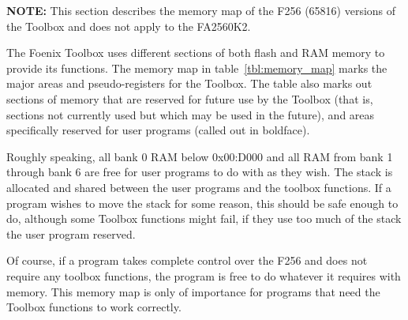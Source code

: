 \begin{tcolorbox}
	{\bf NOTE:} This section describes the memory map of the F256 (65816) versions of the Toolbox and does not apply to the FA2560K2.
\end{tcolorbox}

The Foenix Toolbox uses different sections of both flash and RAM memory to provide its functions.
The memory map in table~\ref{tbl:memory_map} marks the major areas and pseudo-registers for the Toolbox.
The table also marks out sections of memory that are reserved for future use by the Toolbox (that is,
sections not currently used but which may be used in the future), and areas specifically reserved for user
programs (called out in boldface).

Roughly speaking, all bank 0 RAM below 0x00:D000 and all RAM from bank 1 through bank 6 are free for user programs
to do with as they wish. The stack is allocated and shared between the user programs and the toolbox functions.
If a program wishes to move the stack for some reason, this should be safe enough to do, although some Toolbox functions
might fail, if they use too much of the stack the user program reserved.

Of course, if a program takes complete control over the F256 and does not require any toolbox functions, the program is free
to do whatever it requires with memory. This memory map is only of importance for programs that need the Toolbox functions to
work correctly.

